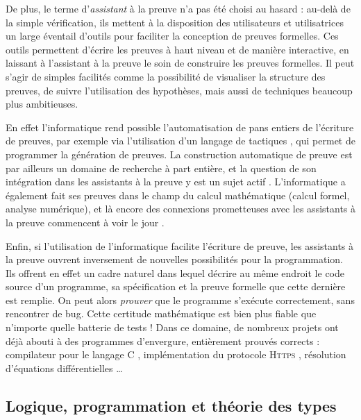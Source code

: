 De plus, le terme d’\emph{assistant} à la preuve n’a pas été choisi au hasard : au-delà
de la simple vérification, ils mettent à la disposition des
utilisateurs et utilisatrices un large éventail d’outils pour
faciliter la conception de preuves formelles.
Ces outils permettent d’écrire
les preuves à haut niveau et de manière interactive,%
en laissant à l’assistant à la preuve le soin de construire les preuves formelles.
Il peut s’agir de simples facilités
comme la possibilité de visualiser la structure des
preuves, de suivre l’utilisation des hypothèses, mais aussi
de techniques beaucoup plus ambitieuses.

En effet l’informatique rend possible
l’automatisation de pans entiers de l’écriture de preuves,
par exemple via l’utilisation d’un langage de tactiques ,
qui permet de programmer la génération de preuves.
La construction automatique de preuve est par ailleurs un domaine de recherche à part entière,
et la question de son intégration dans les assistants à la
preuve y est un sujet actif .
L’informatique a également fait ses preuves dans le champ du calcul mathématique
(calcul formel, analyse numérique), et là encore des connexions prometteuses
avec les assistants à la preuve commencent à voir le jour .

Enfin, si l’utilisation de l’informatique facilite l’écriture de preuve,
les assistants à la preuve ouvrent inversement
de nouvelles possibilités pour la programmation.
Ils offrent en effet un cadre naturel dans lequel décrire au même endroit
le code source d’un programme, sa spécification et la preuve formelle que cette 
dernière est remplie. On peut alors \emph{prouver} que le
programme s’exécute correctement, sans rencontrer de bug.
Cette certitude mathématique est bien plus fiable que n’importe quelle batterie de tests !
Dans ce domaine, de nombreux projets ont déjà abouti à des programmes d’envergure,
entièrement prouvés corrects : compilateur pour le langage C ,
implémentation du protocole \textsc{Https} ,
résolution d’équations différentielles …

\subsection{Logique, programmation et théorie des types}

